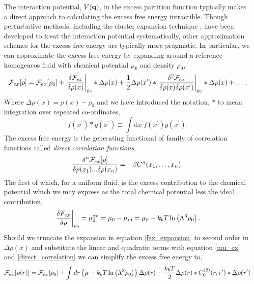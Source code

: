 The interaction potential, $V(\mathbf{q})$, in the excess partition function typically
makes a direct approach to calculating the excess free energy intractible.
Though perturbative methods, including the cluster expansion technique
\cite{MAYER41}, have been developed to treat the interaction potential
systematically, other approximation schemes for the excess free energy are
typically more pragmatic.  In particular, we can approximate the excess free
energy by expanding around a reference homogeneos fluid with chemical potential
$\mu_0$ and density $\rho_0$,
%
\begin{equation}
    \label{fex_expansion}
    \mathcal{F}_{ex}[\rho] = \mathcal{F}_{ex}[\rho_0]
        + \left . \frac{\delta \mathcal{F}_{ex}}{\delta\rho(x)} \right\vert_{\rho_0} \ast \Delta\rho(x) 
        + \frac{1}{2} \Delta\rho(x^\prime) \ast
            \left . \frac{\delta^2 \mathcal{F}_{ex}}{\delta\rho(x)\delta\rho(x^\prime)}
            \right\vert_{\rho_0} \ast \Delta\rho(x) 
        + \dots,
\end{equation}
%
Where $\Delta\rho(x) = \rho(x) - \rho_0$ and we have introduced the notation,
$\ast$ to mean integration over repeated co-ordinates,
%
\begin{equation}
    f(x^\prime) \ast g(x^\prime)
        \equiv \int\mathrm{d}x^\prime f(x^\prime) g(x^\prime).
\end{equation}
%
The excess free energy is the generating functional of family of correlation
functions called \textit{direct correlation functions}, 
%
\begin{equation}
    \label{direct_correlation}
    \frac{\delta^n \mathcal{F}_{ex}[\rho]}{\delta \rho(x_1) ... \delta \rho(x_n)}
        = -\beta C^{n}(x_1, \dots, x_n).
\end{equation}
%
The first of which, for a uniform fluid, is the excess contribution to the
chemical potential which we may express as the total chemical potential less
the ideal contribution, 
%
\begin{equation}
    \label{mu_ex}
    \left.\frac{\delta F_{ex}}{\delta \rho}\right\vert_{\rho_0}
        = \mu_0^{ex}
        = \mu_0 - \mu_{id} 
        = \mu_0 - k_bT\ln\left(\Lambda^3 \rho_0\right).
\end{equation}
%
Should we truncate the expansion in equation \ref{fex_expansion} to second
order in $\Delta\rho(x)$ and substitute the linear and quadratic terms with
equation \ref{mu_ex} and \ref{direct_correlation} we can simplify the excess
free energy to,
%
\begin{equation}
    \label{F_ex}
    \mathcal{F}_{ex}[\rho(r)] = \mathcal{F}_{ex}[\rho_0] 
        + \int dr 
            \left\lbrace\mu - k_bT \ln\left(\Lambda^3 \rho_0 \right)
            \right\rbrace \Delta\rho(r)
        - \frac{k_b T}{2} \Delta\rho(r) \ast C^{(2)}_0(r, r^\prime) 
            \ast \Delta\rho(r^\prime)
\end{equation}

